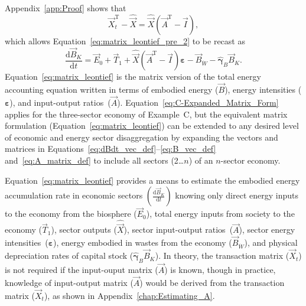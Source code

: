 %
Appendix~\ref{app:Proof} shows that
%
\begin{equation} \label{eq:Xdifference1}
	\vec{X}_{t}^{\mathrm{T}} 
	- \hat{\vec{X}} 
	= \hat{\vec{X}} (\vec{A}^{\mathrm{T}} - \vec{I}),
\end{equation}
%
which allows Equation~\ref{eq:matrix_leontief_pre_2}
to be recast as
%
\begin{equation} \label{eq:matrix_leontief}
	\frac{\mathrm{d}\vec{B}_{K}}{\mathrm{d}t} 
	= \vec{E}_{0}
	+ \vec{T}_{1}
	+ \hat{\vec{X}} (\vec{A}^{\mathrm{T}} - \vec{I})\boldsymbol{\varepsilon} 
	- \vec{B}_{\dot{W}}
	- \hat{\boldsymbol{\gamma}}_{B}\vec{B}_{K}.
\end{equation}
%
Equation~\ref{eq:matrix_leontief} is the matrix version 
of the total energy accounting equation
written in terms of embodied energy ($\vec{B}$), 
energy intensities ($\boldsymbol{\varepsilon}$),
and input-output ratios~($\vec{A}$).
Equation~\ref{eq:C-Expanded_Matrix_Form} applies 
for the three-sector economy of Example~C, 
but the equivalent matrix formulation (Equation~\ref{eq:matrix_leontief}) 
can be extended to any desired level 
of economic and energy sector disaggregation 
by expanding the vectors and matrices in 
Equations~\ref{eq:dBdt_vec_def}--\ref{eq:B_vec_def}
and~\ref{eq:A_matrix_def} to include
all sectors (2\ldots $n$) of an $n$-sector economy.\cite{Bullard:1978vd,Casler1984}

Equation~\ref{eq:matrix_leontief} provides a means to 
estimate the embodied energy accumulation rate
in economic sectors $\left(\frac{\mathrm{d}\vec{B}_{K}}{\mathrm{d}t}\right)$ 
knowing only 
direct energy inputs to the economy from the biosphere ($\vec{E}_{0}$), 
total energy inputs from society to the economy ($\vec{T}_{1}$),
sector outputs ($\hat{\vec{X}}$), 
sector input-output ratios~($\vec{A}$), 
sector energy intensities~($\boldsymbol{\varepsilon}$), 
energy embodied in wastes from the economy ($\vec{B}_{\dot{W}}$),
and physical depreciation rates of capital stock ($\hat{\boldsymbol{\gamma}}_{B}\vec{B}_{K}$). 
In theory, the transaction matrix ($\vec{X}_{t}$) is not required 
if the input-ouput matrix ($\vec{A}$) is known, 
though in practice, 
knowledge of input-output matrix ($\vec{A}$) 
would be derived from the transaction matrix ($\vec{X}_{t}$),
as shown in Appendix~\ref{chap:Estimating_A}.


